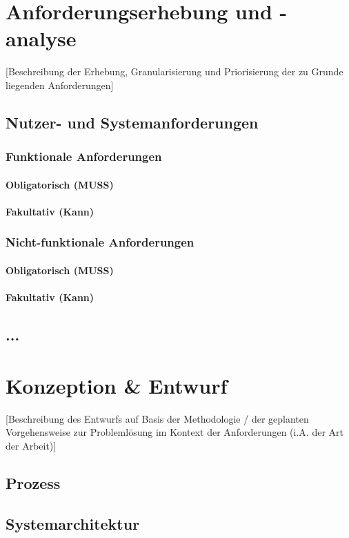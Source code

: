 \documentclass[oneside,bibliography=totocnumbered,BCOR=5mm]{scrbook}
\begin{document}
\chapter{Anforderungserhebung und -analyse}
[Beschreibung der Erhebung, Granularisierung und Priorisierung der zu Grunde liegenden Anforderungen]
\section{Nutzer- und Systemanforderungen}
\subsection{Funktionale Anforderungen}
\subsubsection{Obligatorisch (MUSS)}
\subsubsection{Fakultativ (Kann)}
\subsection{Nicht-funktionale Anforderungen}

\subsubsection{Obligatorisch (MUSS)}
\subsubsection{Fakultativ (Kann)}
\section{...}




\chapter{Konzeption \& Entwurf}
[Beschreibung des Entwurfs auf Basis der Methodologie / der geplanten Vorgehensweise zur Probleml\"osung im Kontext der Anforderungen (i.A. der Art der Arbeit)]
\section{Prozess}
\section{Systemarchitektur}
\end{document}
